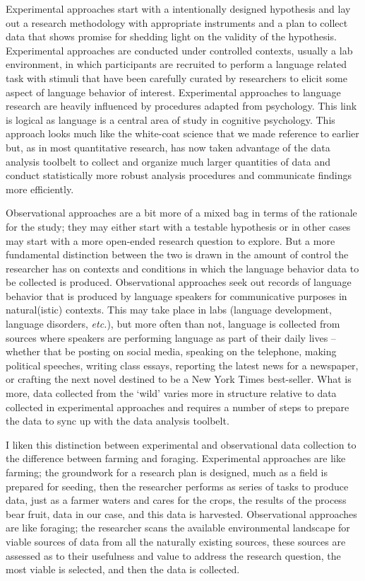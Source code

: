 \documentclass[
  letterpaper,
]{latex/krantz}
\begin{document}
Experimental approaches start with a intentionally designed hypothesis
and lay out a research methodology with appropriate instruments and a
plan to collect data that shows promise for shedding light on the
validity of the hypothesis. Experimental approaches are conducted under
controlled contexts, usually a lab environment, in which participants
are recruited to perform a language related task with stimuli that have
been carefully curated by researchers to elicit some aspect of language
behavior of interest. Experimental approaches to language research are
heavily influenced by procedures adapted from psychology. This link is
logical as language is a central area of study in cognitive psychology.
This approach looks much like the white-coat science that we made
reference to earlier but, as in most quantitative research, has now
taken advantage of the data analysis toolbelt to collect and organize
much larger quantities of data and conduct statistically more robust
analysis procedures and communicate findings more efficiently.

Observational approaches are a bit more of a mixed bag in terms of the
rationale for the study; they may either start with a testable
hypothesis or in other cases may start with a more open-ended research
question to explore. But a more fundamental distinction between the two
is drawn in the amount of control the researcher has on contexts and
conditions in which the language behavior data to be collected is
produced. Observational approaches seek out records of language behavior
that is produced by language speakers for communicative purposes in
natural(istic) contexts. This may take place in labs (language
development, language disorders, \emph{etc.}), but more often than not,
language is collected from sources where speakers are performing
language as part of their daily lives --whether that be posting on
social media, speaking on the telephone, making political speeches,
writing class essays, reporting the latest news for a newspaper, or
crafting the next novel destined to be a New York Times best-seller.
What is more, data collected from the `wild' varies more in structure
relative to data collected in experimental approaches and requires a
number of steps to prepare the data to sync up with the data analysis
toolbelt.

I liken this distinction between experimental and observational data
collection to the difference between farming and foraging. Experimental
approaches are like farming; the groundwork for a research plan is
designed, much as a field is prepared for seeding, then the researcher
performs as series of tasks to produce data, just as a farmer waters and
cares for the crops, the results of the process bear fruit, data in our
case, and this data is harvested. Observational approaches are like
foraging; the researcher scans the available environmental landscape for
viable sources of data from all the naturally existing sources, these
sources are assessed as to their usefulness and value to address the
research question, the most viable is selected, and then the data is
collected.
\end{document}

